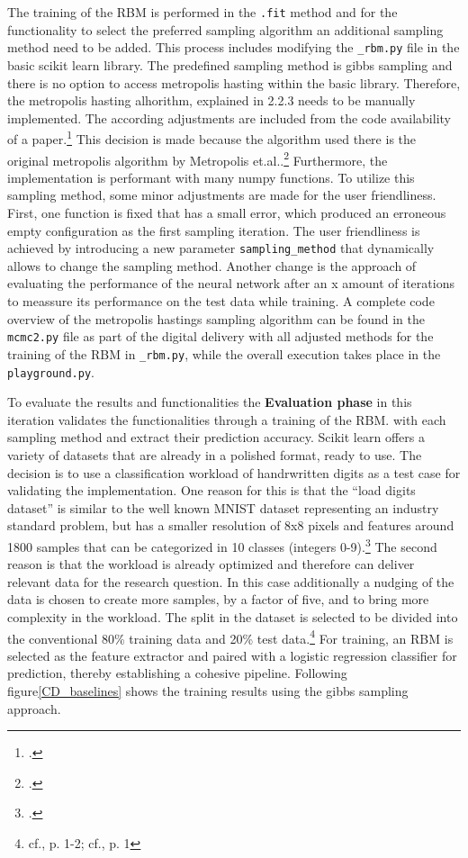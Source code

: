 The training of the \ac{RBM} is performed in the \texttt{.fit} method and for the functionality to select the preferred sampling algorithm an additional sampling method need to be added.
This process includes modifying the \texttt{\_rbm.py} file in the basic scikit learn library.
The predefined sampling method is gibbs sampling and there is no option to access metropolis hasting within the basic library. 
Therefore, the metropolis hasting alhorithm, explained in 2.2.3 needs to be manually implemented.
The according adjustments are included from the code availability of a paper.\footcite[cf.][11-12]{bohmNoiseinjectedAnalogIsing2022}
This decision is made because the algorithm used there is the original metropolis algorithm by Metropolis et.al..\footcite[cf.][1087-1092]{metropolisEquationStateCalculations1953}
Furthermore, the implementation is performant with many numpy functions. 
To utilize this sampling method, some minor adjustments are made for the user friendliness. 
First, one function is fixed that has a small error, which produced an erroneous empty configuration as the first sampling iteration. 
The user friendliness is achieved by introducing a new parameter \texttt{sampling\_method} that dynamically allows to change the sampling method. 
Another change is the approach of evaluating the performance of the neural network after an x amount of iterations to meassure its performance on the test data while training.
A complete code overview of the metropolis hastings sampling algorithm can be found in the \texttt{mcmc2.py} file as part of the digital delivery with all
adjusted methods for the training of the \ac{RBM} in \texttt{\_rbm.py}, while the overall execution takes place in the \texttt{playground.py}.

To evaluate the results and functionalities the \textbf{Evaluation phase} in this iteration validates the functionalities through a training of the \ac{RBM}. with each sampling method and extract their prediction accuracy.
Scikit learn offers a variety of datasets that are already in a polished format, ready to use. 
The decision is to use a classification workload of handrwritten digits as a test case for validating the implementation.
One reason for this is that the ``load digits dataset'' is similar to the well known MNIST dataset representing an industry standard problem, but has a smaller resolution of 8x8 pixels and features around 1800 samples that can be categorized in 10 classes (integers 0-9).\footcite[cf.][1]{SklearnDatasetsLoad_digits}
The second reason is that the workload is already optimized and therefore can deliver relevant data for the research question.
In this case additionally a nudging of the data is chosen to create more samples, by a factor of five, and to bring more complexity in the workload. 
The split in the dataset is selected to be divided into the conventional 80\% training data and 20\% test data.\footnote{cf.\cite{charithaTypeIIDiabetesPrediction2022a}, p. 1-2; cf.\cite{supriAsianStockIndex2023}, p. 1}
For training, an \ac{RBM} is selected as the feature extractor and paired with a logistic regression classifier for prediction, thereby establishing a cohesive pipeline.
Following figure\ref{CD_baselines} shows the training results using the gibbs sampling approach. 

